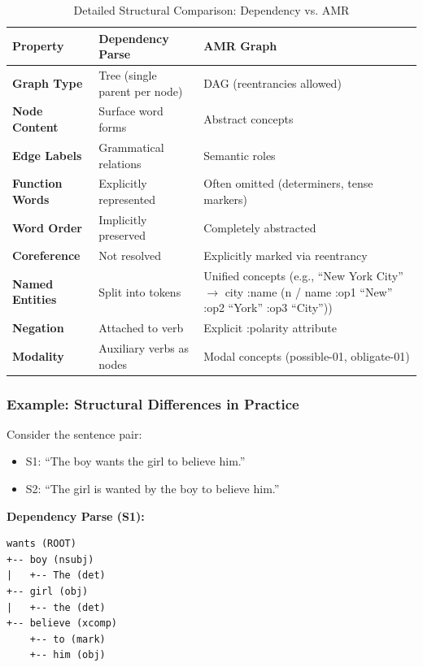 \documentclass[11pt,a4paper]{article}
\begin{document}
\begin{table}[h]
\centering
\caption{Detailed Structural Comparison: Dependency vs. AMR}
\begin{tabular}{p{3.5cm}p{5.5cm}p{5.5cm}}
\toprule
\textbf{Property} & \textbf{Dependency Parse} & \textbf{AMR Graph} \\
\midrule
\textbf{Graph Type} & Tree (single parent per node) & DAG (reentrancies allowed) \\
\textbf{Node Content} & Surface word forms & Abstract concepts \\
\textbf{Edge Labels} & Grammatical relations & Semantic roles \\
\textbf{Function Words} & Explicitly represented & Often omitted (determiners, tense markers) \\
\textbf{Word Order} & Implicitly preserved & Completely abstracted \\
\textbf{Coreference} & Not resolved & Explicitly marked via reentrancy \\
\textbf{Named Entities} & Split into tokens & Unified concepts (e.g., ``New York City'' $\to$ city :name (n / name :op1 ``New'' :op2 ``York'' :op3 ``City'')) \\
\textbf{Negation} & Attached to verb & Explicit :polarity attribute \\
\textbf{Modality} & Auxiliary verbs as nodes & Modal concepts (possible-01, obligate-01) \\
\bottomrule
\end{tabular}
\end{table}

\subsubsection{Example: Structural Differences in Practice}

Consider the sentence pair:
\begin{itemize}
    \item S1: ``The boy wants the girl to believe him.''
    \item S2: ``The girl is wanted by the boy to believe him.''
\end{itemize}

\textbf{Dependency Parse (S1):}
\begin{verbatim}
wants (ROOT)
+-- boy (nsubj)
|   +-- The (det)
+-- girl (obj)
|   +-- the (det)
+-- believe (xcomp)
    +-- to (mark)
    +-- him (obj)
\end{verbatim}
\end{document}
